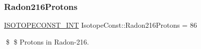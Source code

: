 \subsubsection{\texorpdfstring{Radon216\+Protons}{Radon216Protons}}
{\footnotesize\ttfamily \mbox{\hyperlink{group___isotope_const-_macros_ga5f18360b3e99483a35c32d789e62621c}{I\+S\+O\+T\+O\+P\+E\+C\+O\+N\+S\+T\+\_\+\+I\+NT}} Isotope\+Const\+::\+Radon216\+Protons = 86}

\$ \$ Protons in Radon-\/216. 